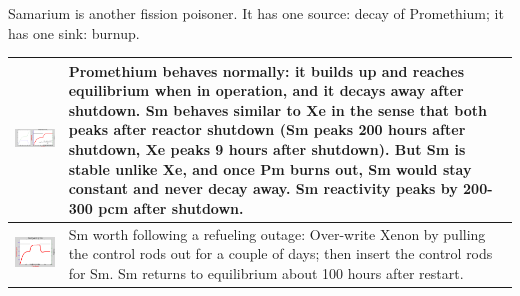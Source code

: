 \documentclass{school-22.211-notes}
\begin{document}
\clearpage
{} \label{FP-Sm}
Samarium is another fission poisoner. It has one source: decay of Promethium; it has one sink: burnup. 

\begin{table}
  \centering
  \begin{tabular}{|p{}|p{}|}\hline
    \begin{minipage}[b]{0.6\textwidth}
      \includegraphics[width=3.5in]{images/dfs/Pm-Sm-1.png} 
    \end{minipage}
    & 
    \begin{minipage}[b]{0.4\textwidth}
      Promethium behaves normally: it builds up and reaches equilibrium when in operation, and it decays away after shutdown. 
Sm behaves similar to Xe in the sense that both peaks after reactor shutdown (Sm peaks 200 hours after shutdown, Xe peaks 9 hours after shutdown). But Sm is stable unlike Xe, and once Pm burns out, Sm would stay constant and never decay away. Sm reactivity peaks by 200-300 pcm after shutdown. 
    \end{minipage}   \\ \hline
%
    \begin{minipage}[b]{0.6\textwidth}
      \includegraphics[width=3.5in]{images/dfs/Pm-Sm-2.png} 
    \end{minipage}
    & 
    \begin{minipage}[b]{0.4\textwidth}    
     Sm worth following a refueling outage: Over-write Xenon by pulling the control rods out for a couple of days; then insert the control rods for Sm. Sm returns to equilibrium about 100 hours after restart.

\end{minipage}
\end{tabular}
\end{table}
\end{document}
